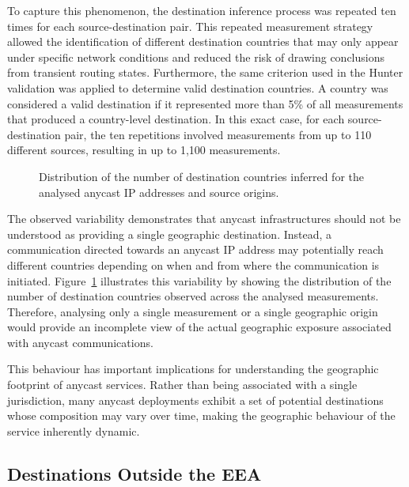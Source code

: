 To capture this phenomenon, the destination inference process was repeated ten times for each source-destination pair. This repeated measurement strategy allowed the identification of different destination countries that may only appear under specific network conditions and reduced the risk of drawing conclusions from transient routing states. Furthermore, the same criterion used in the Hunter validation was applied to determine valid destination countries. A country was considered a valid destination if it represented more than 5\% of all measurements that produced a country-level destination. In this exact case, for each source-destination pair, the ten repetitions involved measurements from up to 110 different sources, resulting in up to 1,100 measurements.

\begin{figure}[ht]
    \centering
    
    \caption{Distribution of the number of destination countries inferred for the analysed anycast IP addresses and source origins.}
    \label{fig:ip_destination_countries_histogram}
\end{figure}

The observed variability demonstrates that anycast infrastructures should not be understood as providing a single geographic destination. Instead, a communication directed towards an anycast IP address may potentially reach different countries depending on when and from where the communication is initiated. Figure~\ref{fig:ip_destination_countries_histogram} illustrates this variability by showing the distribution of the number of destination countries observed across the analysed measurements. Therefore, analysing only a single measurement or a single geographic origin would provide an incomplete view of the actual geographic exposure associated with anycast communications.

This behaviour has important implications for understanding the geographic footprint of anycast services. Rather than being associated with a single jurisdiction, many anycast deployments exhibit a set of potential destinations whose composition may vary over time, making the geographic behaviour of the service inherently dynamic.

\subsection{Destinations Outside the EEA}
\label{sc:anycast_experiments_non_eea}

